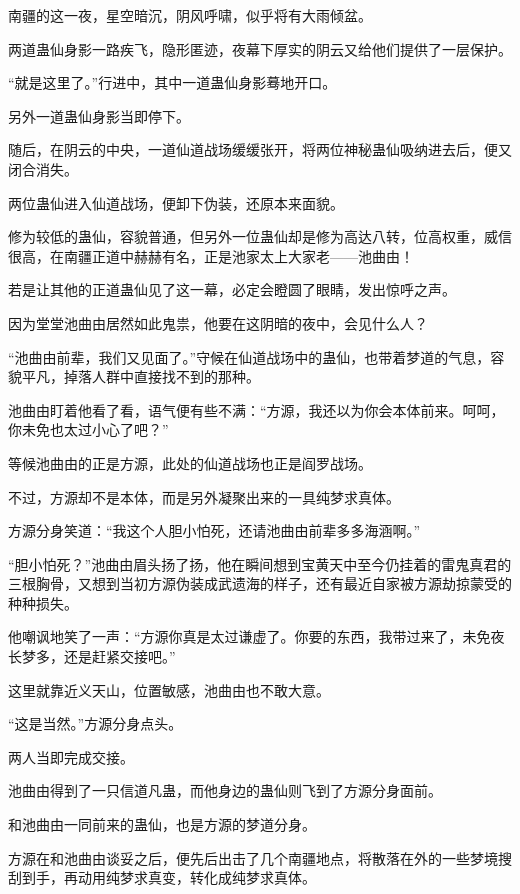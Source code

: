 
\begin{this_body}



南疆的这一夜，星空暗沉，阴风呼啸，似乎将有大雨倾盆。

两道蛊仙身影一路疾飞，隐形匿迹，夜幕下厚实的阴云又给他们提供了一层保护。

“就是这里了。”行进中，其中一道蛊仙身影蓦地开口。

另外一道蛊仙身影当即停下。

随后，在阴云的中央，一道仙道战场缓缓张开，将两位神秘蛊仙吸纳进去后，便又闭合消失。

两位蛊仙进入仙道战场，便卸下伪装，还原本来面貌。

修为较低的蛊仙，容貌普通，但另外一位蛊仙却是修为高达八转，位高权重，威信很高，在南疆正道中赫赫有名，正是池家太上大家老——池曲由！

若是让其他的正道蛊仙见了这一幕，必定会瞪圆了眼睛，发出惊呼之声。

因为堂堂池曲由居然如此鬼祟，他要在这阴暗的夜中，会见什么人？

“池曲由前辈，我们又见面了。”守候在仙道战场中的蛊仙，也带着梦道的气息，容貌平凡，掉落人群中直接找不到的那种。

池曲由盯着他看了看，语气便有些不满：“方源，我还以为你会本体前来。呵呵，你未免也太过小心了吧？”

等候池曲由的正是方源，此处的仙道战场也正是阎罗战场。

不过，方源却不是本体，而是另外凝聚出来的一具纯梦求真体。

方源分身笑道：“我这个人胆小怕死，还请池曲由前辈多多海涵啊。”

“胆小怕死？”池曲由眉头扬了扬，他在瞬间想到宝黄天中至今仍挂着的雷鬼真君的三根胸骨，又想到当初方源伪装成武遗海的样子，还有最近自家被方源劫掠蒙受的种种损失。

他嘲讽地笑了一声：“方源你真是太过谦虚了。你要的东西，我带过来了，未免夜长梦多，还是赶紧交接吧。”

这里就靠近义天山，位置敏感，池曲由也不敢大意。

“这是当然。”方源分身点头。

两人当即完成交接。

池曲由得到了一只信道凡蛊，而他身边的蛊仙则飞到了方源分身面前。

和池曲由一同前来的蛊仙，也是方源的梦道分身。

方源在和池曲由谈妥之后，便先后出击了几个南疆地点，将散落在外的一些梦境搜刮到手，再动用纯梦求真变，转化成纯梦求真体。


\end{this_body}
